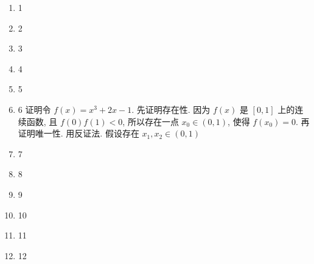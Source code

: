 \documentclass[a4paper, 11pt]{ctexart}
\begin{document}
\pagestyle{empty}
\begin{enumerate}
    \item 1
    \item 2
    \item 3
    \item 4
    \item 5
    \item 6
        {\heiti 证明}\quad 令 $f(x) = x^3 + 2x - 1$. 先证明存在性. 因为 $f(x)$ 是 $[0, 1]$ 上的连续函数, 且 $f(0)f(1) < 0$, 所以存在一点 $x_0 \in (0, 1)$, 使得 $f(x_0) = 0$.
        再证明唯一性. 用反证法. 假设存在 $x_1, x_2 \in (0, 1)$
    \item 7
    \item 8
    \item 9
    \item 10
    \item 11
    \item 12
\end{enumerate}
\end{document}
